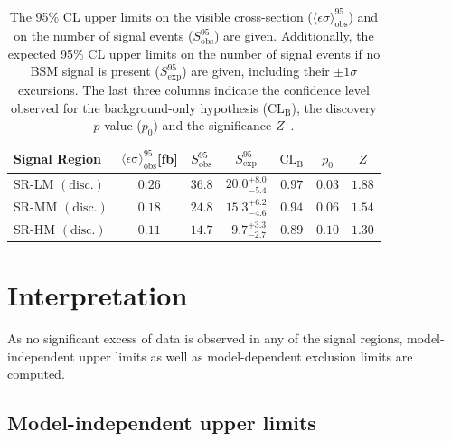 \begin{table}
\begin{center}
\begin{tabular}{lcccccc}
\toprule
\textbf{Signal Region}                       & $\langle\epsilon{\mathrm{ \sigma}}\rangle_{\mathrm{ obs}}^{95}$[fb]  &  $S_{\mathrm{ obs}}^{95}$  & $S_{\mathrm{ exp}}^{95}$ & $\textrm{CL}_{\textrm{B}}$ & $p_{0}$ & $Z$  \\
\midrule
 SR-LM $\mathrm{(disc.)}$    & $0.26$ &  $36.8$ & $ { 20.0 }^{ +8.0 }_{ -5.4 }$ & $0.97$ & $ 0.03$&$1.88$ \\%
 SR-MM $\mathrm{(disc.)}$    & $0.18$ &  $24.8$ & $ { 15.3 }^{ +6.2 }_{ -4.6 }$ & $0.94$ & $ 0.06$&$1.54$ \\%
 SR-HM $\mathrm{(disc.)}$    & $0.11$ &  $14.7$ & $ { ~~9.7 }^{ +3.3 }_{ -2.7 }$ & $0.89$ & $ 0.10$&$1.30$ \\%

\bottomrule
\end{tabular}
\caption[Breakdown of upper limits.]{
The 95\% CL upper limits on the visible cross-section ($\langle\epsilon\sigma\rangle_{\mathrm{ obs}}^{95}$) and on the number of
signal events ($S_{\mathrm{ obs}}^{95}$) are given. Additionally, the expected 95\% CL upper limits on the number of signal events if no BSM signal is present ($S_{\mathrm{ exp}}^{95}$) are given, including their $\pm 1\sigma$ excursions. The last three columns indicate the confidence level observed for the background-only hypothesis ($\textrm{CL}_{\textrm{B}}$), the discovery $p$-value ($p_{0}$) and the significance $Z$~\cite{Cousins:2007bmb}.}
\label{tab:upperlimit_toys}
\end{center}
\end{table}

\section{Interpretation}\label{sec:results_interpretation}

As no significant excess of data is observed in any of the signal regions, model-independent upper limits as well as model-dependent exclusion limits are computed.

\subsection{Model-independent upper limits} 

